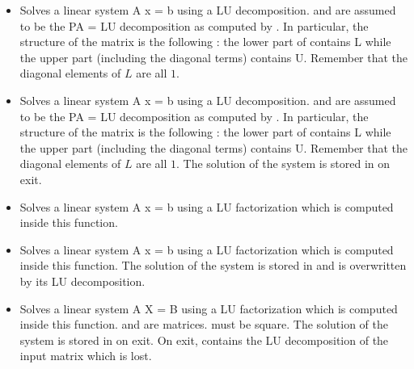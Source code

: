 \begin{itemize}
\item {} 
  \sshortdescribe Solves a linear system A x = b using a LU decomposition.
   and  are assumed to be the PA = LU decomposition as computed
  by . In particular, the structure of the matrix 
  is the following : the lower part of  contains L while the upper part
  (including the diagonal terms) contains U. Remember that the diagonal
  elements of $L$ are all $1$.

\item {} 
  \sshortdescribe Solves a linear system A x = b using a LU decomposition.
   and  are assumed to be the PA = LU decomposition as computed
  by . In particular, the structure of the matrix 
  is the following : the lower part of  contains L while the upper part
  (including the diagonal terms) contains U. Remember that the diagonal
  elements of $L$ are all $1$. The solution of the system is stored in 
  on exit.
  
\item {} 
  \sshortdescribe Solves a linear system A x = b using a LU factorization
  which is computed inside this function.

\item {} 
  \sshortdescribe Solves a linear system A x = b using a LU factorization
  which is computed inside this function. The solution of the system is stored
  in  and  is overwritten by its LU decomposition.

\item {} 
  \sshortdescribe Solves a linear system A X = B using a LU factorization
  which is computed inside this function.  and   are
  matrices.  must be square. The solution of the system is stored in
   on exit. On exit,  contains the LU decomposition of the input
  matrix which is lost.


\end{itemize}

